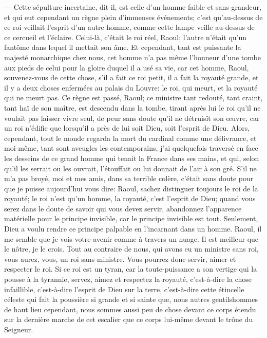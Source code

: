 — Cette sépulture incertaine, dit-il, est celle d'un homme faible et sans grandeur, et qui eut cependant un règne plein d'immenses événements; c'est qu'au-dessus de ce roi veillait l'esprit d'un autre homme, comme cette lampe veille au-dessus de ce cercueil et l'éclaire. Celui-là, c'était le roi réel, Raoul; l'autre n'était qu'un fantôme dans lequel il mettait son âme. Et cependant, tant est puissante la majesté monarchique chez nous, cet homme n'a pas même l'honneur d'une tombe aux pieds de celui pour la gloire duquel il a usé sa vie, car cet homme, Raoul, souvenez-vous de cette chose, s'il a fait ce roi petit, il a fait la royauté grande, et il y a deux choses enfermées au palais du Louvre: le roi, qui meurt, et la royauté qui ne meurt pas. Ce règne est passé, Raoul; ce ministre tant redouté, tant craint, tant haï de son maître, est descendu dans la tombe, tirant après lui le roi qu'il ne voulait pas laisser vivre seul, de peur sans doute qu'il ne détruisît son œuvre, car un roi n'édifie que lorsqu'il a près de lui soit Dieu, soit l'esprit de Dieu. Alors, cependant, tout le monde regarda la mort du cardinal comme une délivrance, et moi-même, tant sont aveugles les contemporains, j'ai quelquefois traversé en face les desseins de ce grand homme qui tenait la France dans ses mains, et qui, selon qu'il les serrait ou les ouvrait, l'étouffait ou lui donnait de l'air à son gré. S'il ne m'a pas broyé, moi et mes amis, dans sa terrible colère, c'était sans doute pour que je puisse aujourd'hui vous dire: Raoul, sachez distinguer toujours le roi de la royauté; le roi n'est qu'un homme, la royauté, c'est l'esprit de Dieu; quand vous serez dans le doute de savoir qui vous devez servir, abandonnez l'apparence matérielle pour le principe invisible, car le principe invisible est tout. Seulement, Dieu a voulu rendre ce principe palpable en l'incarnant dans un homme. Raoul, il me semble que je vois votre avenir comme à travers un nuage. Il est meilleur que le nôtre, je le crois. Tout au contraire de nous, qui avons eu un ministre sans roi, vous aurez, vous, un roi sans ministre. Vous pourrez donc servir, aimer et respecter le roi. Si ce roi est un tyran, car la toute-puissance a son vertige qui la pousse à la tyrannie, servez, aimez et respectez la royauté, c'est-à-dire la chose infaillible, c'est-à-dire l'esprit de Dieu sur la terre, c'est-à-dire cette étincelle céleste qui fait la poussière si grande et si sainte que, nous autres gentilshommes de haut lieu cependant, nous sommes aussi peu de chose devant ce corps étendu sur la dernière marche de cet escalier que ce corps lui-même devant le trône du Seigneur.


